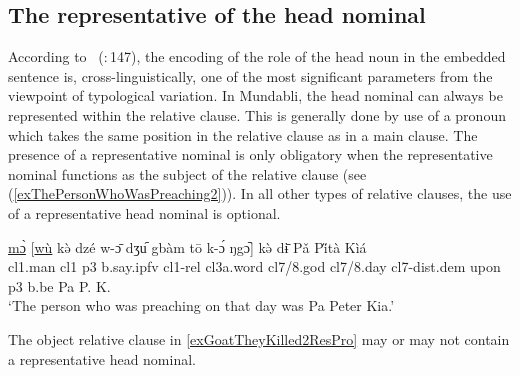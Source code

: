 \documentclass[10pt,twoside]{article}
\newcommand{\gl}[1]{`#1'}
\def\VSP{\vspace{0pt}}
\newcommand{\cl}[1]{{\sc cl#1}}
\newcommand{\citepage}[2]{\citeauthor{#1}~{(\citeyear{#1}:\,{#2})}}
\newcommand{\pref}[1]{(\ref{#1})}
\newcommand{\comment}[1]{\textcolor{blue}{\emph{#1}}}
\begin{document}
\subsection{The representative of the head nominal}\label{secMundabliRepresentativeNominal}
%
%

According to \citepage{Keenan:1985}{147}, the encoding of the role of the head noun in the 
embedded sentence is, cross-linguistically, one of the most significant parameters from 
the viewpoint of typological variation. 
In Mundabli, the head nominal can always be represented within the relative clause. This is generally done by use 
of a pronoun which takes the same position in the relative clause as in a main clause. The presence of 
a representative nominal is only obligatory when the representative nominal functions as the 
subject of the relative clause (see \pref{exThePersonWhoWasPreaching2}).
In all other types of relative clauses, the use of a representative head nominal is optional.

\begin{exe}
	\ex \label{exThePersonWhoWasPreaching2} 		
		\gll \uline{mɔ̀} [\uline{wù} kə̀ dzé w-ɔ̄ dʒu᷇ gbàm tō k-ɔ́ ŋgɔ᷆] kə̀ dɨ̄ Pǎ Pi̋tà Kìá\\
		\cl1.man	\cl1 	{\sc p3}	b.say.{\sc ipfv}	\cl1-{\sc rel}	\cl3a.word \cl7/8.god	\cl7/8.day	\cl7-{\sc dist.dem}	 upon	{\sc p3}	b.be	Pa P. K. \\
		\glt \VSP \gl{The person who was preaching on that day was Pa Peter Kia.}
\end{exe}%

The object relative clause in \ref{exGoatTheyKilled2ResPro} may or may not contain a representative head nominal.
\end{document}
